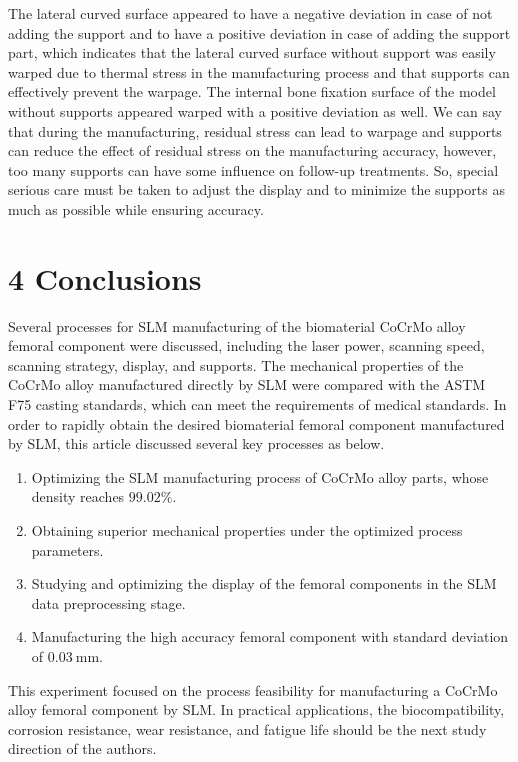 \documentclass[10pt]{article}
\begin{document}
The lateral curved surface appeared to have a negative deviation in case of not adding the support and to have a positive deviation in case of adding the support part, which indicates that the lateral curved surface without support was easily warped due to thermal stress in the manufacturing process and that supports can effectively prevent the warpage. The internal bone fixation surface of the model without supports appeared warped with a positive deviation as well. We can say that during the manufacturing, residual stress can lead to warpage and supports can reduce the effect of residual stress on the manufacturing accuracy, however, too many supports can have some influence on follow-up treatments. So, special serious care must be taken to adjust the display and to minimize the supports as much as possible while ensuring accuracy.

\section*{4 Conclusions}
Several processes for SLM manufacturing of the biomaterial CoCrMo alloy femoral component were discussed, including the laser power, scanning speed, scanning strategy, display, and supports. The mechanical properties of the $\mathrm{CoCrMo}$ alloy manufactured directly by SLM were compared with the ASTM F75 casting standards, which can meet the requirements of medical standards. In order to rapidly obtain the desired biomaterial femoral component manufactured by SLM, this article discussed several key processes as below.

\begin{enumerate}
  \item Optimizing the SLM manufacturing process of CoCrMo alloy parts, whose density reaches $99.02 \%$.

  \item Obtaining superior mechanical properties under the optimized process parameters.

  \item Studying and optimizing the display of the femoral components in the SLM data preprocessing stage.

  \item Manufacturing the high accuracy femoral component with standard deviation of $0.03 \mathrm{~mm}$.

\end{enumerate}

This experiment focused on the process feasibility for manufacturing a CoCrMo alloy femoral component by SLM. In practical applications, the biocompatibility, corrosion resistance, wear resistance, and fatigue life should be the next study direction of the authors.
\end{document}
